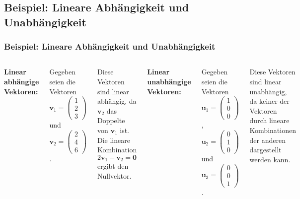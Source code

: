\documentclass{beamer}
\begin{document}
\subsection{Beispiel: Lineare Abhängigkeit und Unabhängigkeit}
\begin{frame}
  \frametitle{Beispiel: Lineare Abhängigkeit und Unabhängigkeit}
  
  \begin{columns}[t]
    \textbf{Linear abhängige Vektoren:}
    
    Gegeben seien die Vektoren $\mathbf{v}_1 = \begin{pmatrix} 1 \\ 2 \\ 3 \end{pmatrix}$ und $\mathbf{v}_2 = \begin{pmatrix} 2 \\ 4 \\ 6 \end{pmatrix}$. 
    
    Diese Vektoren sind linear abhängig, da $\mathbf{v}_2$ das Doppelte von $\mathbf{v}_1$ ist. Die lineare Kombination $2\mathbf{v}_1 - \mathbf{v}_2 = \mathbf{0}$ ergibt den Nullvektor.
    
    \textbf{Linear unabhängige Vektoren:}
    
    Gegeben seien die Vektoren $\mathbf{u}_1 = \begin{pmatrix} 1 \\ 0 \\ 0 \end{pmatrix}$, $\mathbf{u}_2 = \begin{pmatrix} 0 \\ 1 \\ 0 \end{pmatrix}$ und $\mathbf{u}_3 = \begin{pmatrix} 0 \\ 0 \\ 1 \end{pmatrix}$. 
    
    Diese Vektoren sind linear unabhängig, da keiner der Vektoren durch lineare Kombinationen der anderen dargestellt werden kann.
  \end{columns}
\end{frame}
\end{document}

